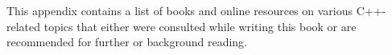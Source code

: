 This appendix contains a list of books and online resources on various C++-related topics that either were consulted while writing this book or are recommended for further or background reading.

